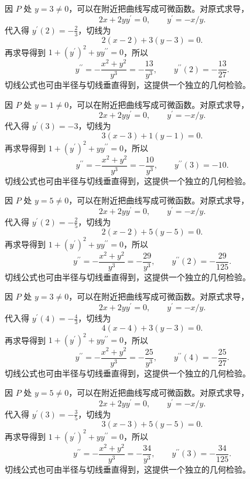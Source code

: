 \documentclass[UTF8,12pt,a4paper,fontset=fandol]{ctexart}
\begin{document}
\begin{solve}\label{ans:c9q2}
因 $P$ 处 $y=3\ne0$，可以在附近把曲线写成可微函数。对原式求导，
\[
2x+2yy^{{\prime}}=0,\qquad y^{{\prime}}=-x/y.
\]
代入得 $y^{\prime}(2)=-\frac{2}{3}$，切线为
\[
2(x-2)+3(y-3)=0.
\]
再求导得到 $1+(y^{\prime})^2+yy^{\prime\prime}=0$，所以
\[
y^{\prime\prime}=-\frac{x^2+y^2}{y^3}=-\frac{13}{y^3},\qquad y^{\prime\prime}(2)=-\frac{13}{27}.
\]
切线公式也可由半径与切线垂直得到，这提供一个独立的几何检验。
\end{solve}

\begin{solve}\label{ans:c9q3}
因 $P$ 处 $y=1\ne0$，可以在附近把曲线写成可微函数。对原式求导，
\[
2x+2yy^{{\prime}}=0,\qquad y^{{\prime}}=-x/y.
\]
代入得 $y^{\prime}(3)=-3$，切线为
\[
3(x-3)+1(y-1)=0.
\]
再求导得到 $1+(y^{\prime})^2+yy^{\prime\prime}=0$，所以
\[
y^{\prime\prime}=-\frac{x^2+y^2}{y^3}=-\frac{10}{y^3},\qquad y^{\prime\prime}(3)=-10.
\]
切线公式也可由半径与切线垂直得到，这提供一个独立的几何检验。
\end{solve}

\begin{solve}\label{ans:c9q4}
因 $P$ 处 $y=5\ne0$，可以在附近把曲线写成可微函数。对原式求导，
\[
2x+2yy^{{\prime}}=0,\qquad y^{{\prime}}=-x/y.
\]
代入得 $y^{\prime}(2)=-\frac{2}{5}$，切线为
\[
2(x-2)+5(y-5)=0.
\]
再求导得到 $1+(y^{\prime})^2+yy^{\prime\prime}=0$，所以
\[
y^{\prime\prime}=-\frac{x^2+y^2}{y^3}=-\frac{29}{y^3},\qquad y^{\prime\prime}(2)=-\frac{29}{125}.
\]
切线公式也可由半径与切线垂直得到，这提供一个独立的几何检验。
\end{solve}

\begin{solve}\label{ans:c9q5}
因 $P$ 处 $y=3\ne0$，可以在附近把曲线写成可微函数。对原式求导，
\[
2x+2yy^{{\prime}}=0,\qquad y^{{\prime}}=-x/y.
\]
代入得 $y^{\prime}(4)=-\frac{4}{3}$，切线为
\[
4(x-4)+3(y-3)=0.
\]
再求导得到 $1+(y^{\prime})^2+yy^{\prime\prime}=0$，所以
\[
y^{\prime\prime}=-\frac{x^2+y^2}{y^3}=-\frac{25}{y^3},\qquad y^{\prime\prime}(4)=-\frac{25}{27}.
\]
切线公式也可由半径与切线垂直得到，这提供一个独立的几何检验。
\end{solve}

\begin{solve}\label{ans:c9q6}
因 $P$ 处 $y=5\ne0$，可以在附近把曲线写成可微函数。对原式求导，
\[
2x+2yy^{{\prime}}=0,\qquad y^{{\prime}}=-x/y.
\]
代入得 $y^{\prime}(3)=-\frac{3}{5}$，切线为
\[
3(x-3)+5(y-5)=0.
\]
再求导得到 $1+(y^{\prime})^2+yy^{\prime\prime}=0$，所以
\[
y^{\prime\prime}=-\frac{x^2+y^2}{y^3}=-\frac{34}{y^3},\qquad y^{\prime\prime}(3)=-\frac{34}{125}.
\]
切线公式也可由半径与切线垂直得到，这提供一个独立的几何检验。
\end{solve}
\end{document}
